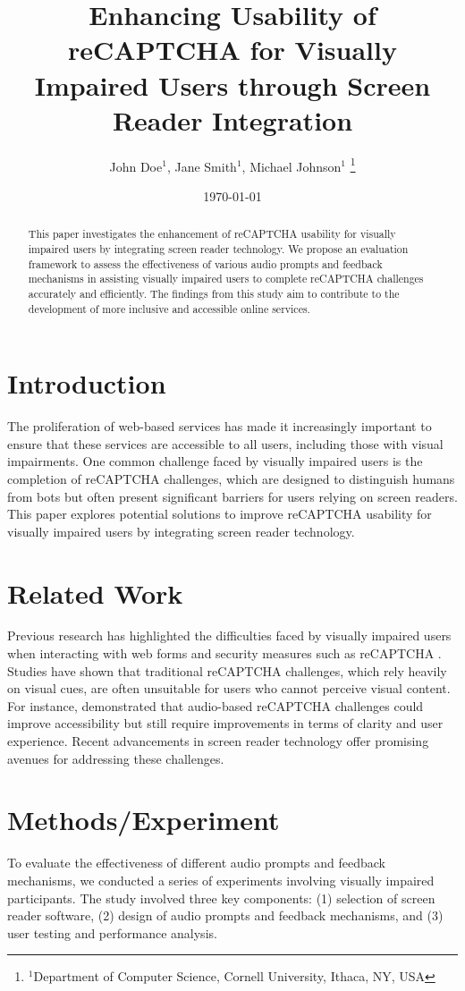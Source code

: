 \documentclass{article}
\title{Enhancing Usability of reCAPTCHA for Visually Impaired Users through Screen Reader Integration}
\author{John Doe$^{1}$, Jane Smith$^{1}$, Michael Johnson$^{1}$
\thanks{$^1$Department of Computer Science, Cornell University, Ithaca, NY, USA}}
\date{\today}
\begin{document}
\maketitle

\begin{abstract}
This paper investigates the enhancement of reCAPTCHA usability for visually impaired users by integrating screen reader technology. We propose an evaluation framework to assess the effectiveness of various audio prompts and feedback mechanisms in assisting visually impaired users to complete reCAPTCHA challenges accurately and efficiently. The findings from this study aim to contribute to the development of more inclusive and accessible online services.
\end{abstract}

\section{Introduction}
The proliferation of web-based services has made it increasingly important to ensure that these services are accessible to all users, including those with visual impairments. One common challenge faced by visually impaired users is the completion of reCAPTCHA challenges, which are designed to distinguish humans from bots but often present significant barriers for users relying on screen readers. This paper explores potential solutions to improve reCAPTCHA usability for visually impaired users by integrating screen reader technology.

\section{Related Work}
Previous research has highlighted the difficulties faced by visually impaired users when interacting with web forms and security measures such as reCAPTCHA \cite{ref1, ref2}. Studies have shown that traditional reCAPTCHA challenges, which rely heavily on visual cues, are often unsuitable for users who cannot perceive visual content. For instance, \cite{ref3} demonstrated that audio-based reCAPTCHA challenges could improve accessibility but still require improvements in terms of clarity and user experience. Recent advancements in screen reader technology offer promising avenues for addressing these challenges.

\section{Methods/Experiment}
To evaluate the effectiveness of different audio prompts and feedback mechanisms, we conducted a series of experiments involving visually impaired participants. The study involved three key components: (1) selection of screen reader software, (2) design of audio prompts and feedback mechanisms, and (3) user testing and performance analysis.
\end{document}
